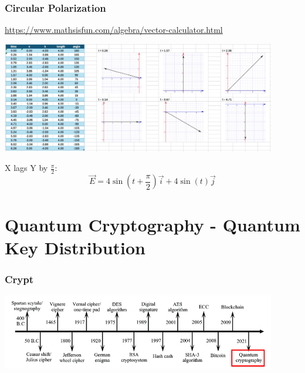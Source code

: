 \documentclass{beamer}
\begin{document}
\begin{frame}\frametitle{Circular Polarization}

\url{https://www.mathsisfun.com/algebra/vector-calculator.html}


\begin{center}
\includegraphics[width=12cm]{fig/pol2.jpg}
\end{center}

X lags Y by $\frac{\pi}{2}$:
\begin{equation}
\vec{E} = 4 \sin{(t + \frac{\pi}{2})} \vec{i} + 4 \sin{(t)} \vec{j}
\end{equation}

\end{frame}

\section{Quantum Cryptography - Quantum Key Distribution}

\begin{frame}\frametitle{Crypt}
\begin{center}
\includegraphics[width=12cm]{fig/crypt1.png}
\end{center}
\end{frame}
\end{document}
